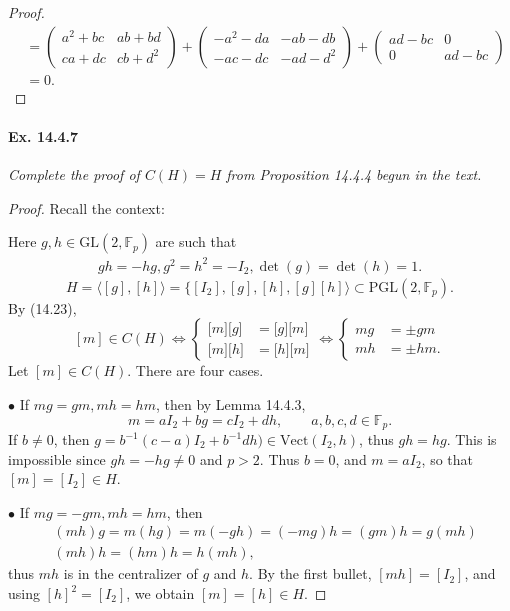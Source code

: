 \documentclass[11pt,a4paper]{article}
\newcommand{\F}{\mathbb{F}}
\begin{document}
{\begin{proof}
\begin{align*}
&=\begin{pmatrix} a^2 + bc & ab + bd\\ ca + dc & cb + d^2 \end{pmatrix} +\begin{pmatrix} -a^2 -da & -ab - db\\ -ac -dc& -ad - d^2\end{pmatrix} + \begin{pmatrix} ad-bc&0\\ 0 & ad-bc\end{pmatrix} \\
&=0.
\end{align*}

\end{proof}

\paragraph{Ex. 14.4.7}{\it Complete the proof of $C(H) = H$ from Proposition 14.4.4 begun in the text.
}
\begin{proof}
Recall the context:

Here $g,h \in \mathrm{GL}(2,\F_p)$ are such that
\begin{align}
gh = -hg, g^2 = h^2 = -I_2, \det(g) = \det(h) = 1.
\end{align}
$$H = \langle [g],[h]\rangle = \{[I_2],[g],[h],[g][h]\rangle \subset \mathrm{PGL}(2,\F_p).$$
By (14.23),
$$
[m] \in C(H)  \iff 
\left\{
\begin{array}{ll}
{[}m{]}{[}g{]} &= {[}g]{[}m{]}\\
{[}m{]}{[}h{]} &= {[}h{]}{[}m{]}
\end{array}
\right.
\iff
\left\{
\begin{array}{ll}
mg &= \pm gm\\
mh &= \pm hm.
\end{array}
\right.
$$
Let $[m] \in C(H)$. There are four cases.

\item[$\bullet$] If $mg = gm, mh = hm$, then by Lemma 14.4.3,
$$m = aI_2+bg =cI_2 + dh,\qquad a,b,c,d \in \F_p.$$
If $b\ne 0$, then $g = b^{-1}(c-a)I_2 + b^{-1}dh) \in \mathrm{Vect}(I_2,h)$, thus $gh = hg$. This is impossible since $gh = -hg \ne 0$ and $p>2$. Thus $b=0$, and  $m = aI_2$, so that $[m] = [I_2] \in H$.

\item[$\bullet$] If $mg = -gm, mh = hm$, then
\begin{align*}
&(mh) g = m(hg) = m(-gh) = (-mg)h = (gm)h = g(mh)\\
&(mh) h = (hm)h = h(mh),
\end{align*}
thus $mh$ is in the centralizer of $g$ and $h$. By the first bullet, $[mh] = [I_2]$, and using $[h]^2 = [I_2]$, we obtain $[m] = [h] \in H$.


\end{proof}}
\end{document}

